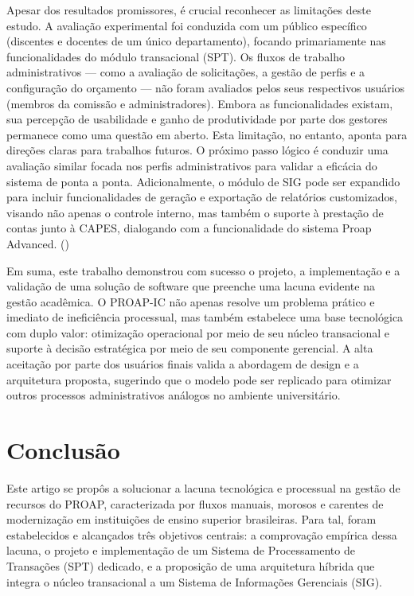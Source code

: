 \documentclass[portuguese]{sbc2025}%
\begin{document}
Apesar dos resultados promissores, é crucial reconhecer as limitações deste estudo. A avaliação experimental foi conduzida com um público específico (discentes e docentes de um único departamento), focando primariamente nas funcionalidades do módulo transacional (SPT). Os fluxos de trabalho administrativos — como a avaliação de solicitações, a gestão de perfis e a configuração do orçamento — não foram avaliados pelos seus respectivos usuários (membros da comissão e administradores). Embora as funcionalidades existam, sua percepção de usabilidade e ganho de produtividade por parte dos gestores permanece como uma questão em aberto. Esta limitação, no entanto, aponta para direções claras para trabalhos futuros. O próximo passo lógico é conduzir uma avaliação similar focada nos perfis administrativos para validar a eficácia do sistema de ponta a ponta. Adicionalmente, o módulo de SIG pode ser expandido para incluir funcionalidades de geração e exportação de relatórios customizados, visando não apenas o controle interno, mas também o suporte à prestação de contas junto à CAPES, dialogando com a funcionalidade do sistema Proap Advanced. (\cite{castro2005sistema})

Em suma, este trabalho demonstrou com sucesso o projeto, a implementação e a validação de uma solução de software que preenche uma lacuna evidente na gestão acadêmica. O PROAP-IC não apenas resolve um problema prático e imediato de ineficiência processual, mas também estabelece uma base tecnológica com duplo valor: otimização operacional por meio de seu núcleo transacional e suporte à decisão estratégica por meio de seu componente gerencial. A alta aceitação por parte dos usuários finais valida a abordagem de design e a arquitetura proposta, sugerindo que o modelo pode ser replicado para otimizar outros processos administrativos análogos no ambiente universitário.

\section{Conclusão}
\label{sec:conclusao}

Este artigo se propôs a solucionar a lacuna tecnológica e processual na gestão de recursos do PROAP, caracterizada por fluxos manuais, morosos e carentes de modernização em instituições de ensino superior brasileiras. Para tal, foram estabelecidos e alcançados três objetivos centrais: a comprovação empírica dessa lacuna, o projeto e implementação de um Sistema de Processamento de Transações (SPT) dedicado, e a proposição de uma arquitetura híbrida que integra o núcleo transacional a um Sistema de Informações Gerenciais (SIG).
\end{document}
